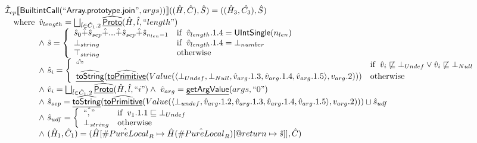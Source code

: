 \documentclass{article}
\makeatletter
\newcommand{\SF}[1]{\mbox{\textsf{#1}}}
\newcommand{\wherec}[1]{{\rm where}\begin{array}[t]{l}#1\end{array}}
\newcommand{\ifc}[1]{{\rm if}\begin{array}[t]{l}#1\end{array}}
\newcommand{\owc}{{\rm otherwise}}
\newcommand{\aI}{\hat{\mathcal{I}}}
\newcommand{\lbr}{\llbracket}
\newcommand{\rbr}{\rrbracket}
\newcommand{\hf}[1]{\underline{\sf #1}}
\newcommand{\ahf}[1]{\widehat{\underline{\sf #1}}}
\newcommand{\varprop}[1]{@#1}
\newcommand{\avarloc}[1]{\hat{\##1}}
\makeatother
\begin{document}
\[\begin{array}{l}
\aI _{cp}\lbr \SF{BuiltintCall}(``\SF{Array.prototype.join}",args))\rbr((\hat{H},\hat{C}), \hat{S})
  = ((\hat{H}_3, \hat{C_3}), \hat{S})\\
\quad\wherec{
  \hat{v}_{length} = \bigsqcup_{\hat{l} \in \hat{C}_1.2}  \ahf{Proto}(\hat{H}, \hat{l}, ``length")\\
  \land\ \hat{s} = \left\{\begin{array}{ll}
      \hat{s}_0 \hat{+} \hat{s}_{sep} \hat{+} ... \hat{+} \hat{s}_{sep} \hat{+} \hat{s}_{n_{len} -1}& \ifc{\hat{v}_{length}.1.4 = \SF{UIntSingle}(n_{len})}\\
      \bot_{string} & \ifc{\hat{v}_{length}.1.4 = \bot_{number}}\\
      \top_{string} & \owc
    \end{array}\right.\\
  \land\ \hat{s}_i = \left\{\begin{array}{ll}
      \hat{``"} & \ifc{\hat{v}_i \not\sqsubseteq \bot_{Undef} \lor \hat{v}_i \not\sqsubseteq \bot_{Null}}\\
      \ahf{toString}(\ahf{toPrimitive}(Value(\langle\bot_{Undef}, \bot_{Null}, \hat{v}_{arg}.1.3, \hat{v}_{arg}.1.4, \hat{v}_{arg}.1.5\rangle, v_{arg}.2))) & \owc
    \end{array}\right.\\
  \land\ \hat{v}_i =  \bigsqcup_{\hat{l} \in \hat{C}_1.2}  \ahf{Proto}(\hat{H}, \hat{l}, ``i")
  \land\ \hat{v}_{arg} = \hf{getArgValue}(args, ``0")\\
  \land\ \hat{s}_{sep} = \ahf{toString}(\ahf{toPrimitive}(Value(\langle\bot_{undef}, \hat{v}_{arg}.1.2, \hat{v}_{arg}.1.3, \hat{v}_{arg}.1.4, \hat{v}_{arg}.1.5\rangle, v_{arg}.2))) \sqcup \hat{s}_{udf}\\
  \land\ \hat{s}_{udf} = \left\{\begin{array}{ll}
      \hat{``,"} & \ifc{v_1.1.1 \sqsubseteq \bot_{Undef}}\\
      \bot_{string} & \owc
    \end{array}\right.\\
  \land\ (\hat{H}_1, \hat{C}_1) = 
      (\hat{H}[\avarloc{PureLocal}_R \mapsto \hat{H}(\avarloc{PureLocal}_R)[\varprop{return} \mapsto \hat{s}]], \hat{C})\\
  }\\
\\\\

\end{array}
\]
\end{document}
